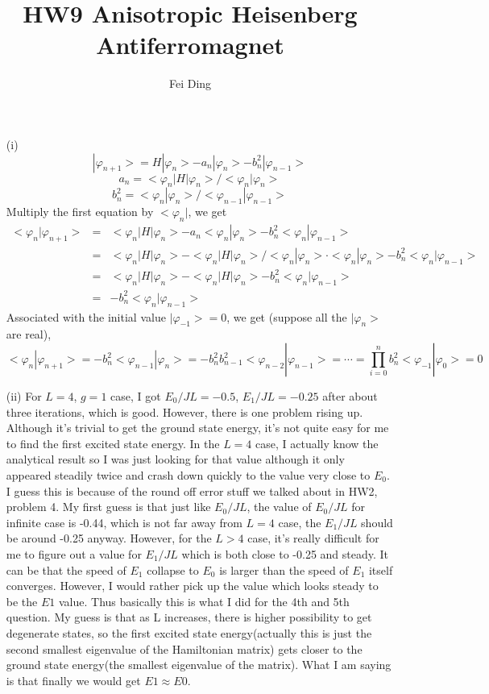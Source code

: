 \documentclass{article}
\title{HW9 Anisotropic Heisenberg Antiferromagnet}
\author{Fei Ding}
\begin{document}
\maketitle
\vskip 1cm

\begin{enumerate}
\item[(i)]
\[|\varphi_{n+1}>=H|\varphi_{n}>-a_n|\varphi_{n}>-b_n^2|\varphi_{n-1}>\]  
\[a_n=<\varphi_n|H|\varphi_n>/<\varphi_n|\varphi_n>\]
\[b_n^2=<\varphi_n|\varphi_n>/<\varphi_{n-1}|\varphi_{n-1}>\]
Multiply the first equation by $<\varphi_n|$, we get 
\begin{eqnarray*}
<\varphi_{n}|\varphi_{n+1}>&=&<\varphi_{n}|H|\varphi_{n}>-a_n<\varphi_{n}|\varphi_{n}>-b_n^2<\varphi_{n}|\varphi_{n-1}>\\
&=&<\varphi_{n}|H|\varphi_{n}>-<\varphi_{n}|H|\varphi_{n}>/<\varphi_n|\varphi_n>\cdot <\varphi_n|\varphi_n>-b_n^2<\varphi_{n}|\varphi_{n-1}>\\
&=&<\varphi_{n}|H|\varphi_{n}>-<\varphi_{n}|H|\varphi_{n}>-b_n^2<\varphi_{n}|\varphi_{n-1}>\\
&=&-b_n^2<\varphi_{n}|\varphi_{n-1}>
\end{eqnarray*}
Associated with the initial value $|\varphi_{-1}>=0$, we get (suppose all the $|\varphi_{n}>$ are real),
\[<\varphi_{n}|\varphi_{n+1}>=-b_n^2<\varphi_{n-1}|\varphi_{n}>=-b_n^2b_{n-1}^2<\varphi_{n-2}|\varphi_{n-1}>=\cdots=\prod_{i=0}^{n} b_n^2<\varphi_{-1}|\varphi_{0}>=0\]
\vskip 1cm
\item[(ii)]
For $L=4$, $g=1$ case, I got $E_0/JL=-0.5$, $E_1/JL=-0.25$ after about three iterations, which is good.  However, there is one problem rising up.  Although it's trivial to get the ground state energy, it's not quite easy for me to find the first excited state energy.  In the $L=4$ case, I actually know the analytical result so I was just looking for that value although it only appeared steadily twice and crash down quickly to the value very close to $E_0$. I guess this is because of the round off error stuff we talked about in HW2, problem 4.  My first guess is that just like $E_0/JL$, the value of $E_0/JL$ for infinite case is -0.44, which is not far away from $L=4$ case, the $E_1/JL$ should be around -0.25 anyway. However, for the $L>4$ case, it's really difficult for me to figure out a value for $E_1/JL$ which is both close to -0.25 and steady.  It can be that the speed of $E_1$ collapse to $E_0$ is larger than the speed of $E_1$ itself converges.  However, I would rather pick up the value which looks steady to be the $E1$ value.  Thus basically this is what I did for the 4th and 5th question.  My guess is that as L increases, there is higher possibility to get degenerate states, so the first excited state energy(actually this is just the second smallest eigenvalue of the Hamiltonian matrix) gets closer to the ground state energy(the smallest eigenvalue of the matrix).  What I am saying is that finally we would get $E1\approx E0$.


\end{enumerate}
\end{document}
